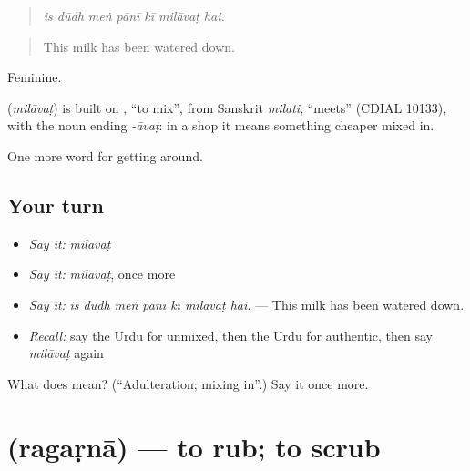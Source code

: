 \begin{quote}
      
\end{quote}

\begin{quote}
\emph{is dūdh meṅ pānī kī milāvaṭ hai.}
\end{quote}

\begin{quote}
This milk has been watered down.
\end{quote}

Feminine.

\begin{cousinweb}
\textbf{} (\emph{milāvaṭ}) is built on \textbf{}, \textquotedblleft{}to mix\textquotedblright{}, from Sanskrit \emph{milati}, \textquotedblleft{}meets\textquotedblright{} (CDIAL 10133), with the noun ending \emph{-āvaṭ}: in a shop it means something cheaper mixed in.
\end{cousinweb}

\begin{grammarlens}[title={What you've built}]
One more word for getting around.
\end{grammarlens}

\subsection*{Your turn}
\begin{itemize}
\raggedright
  \item \emph{Say it:} \emph{milāvaṭ}
  \item \emph{Say it:} \emph{milāvaṭ}, once more
  \item \emph{Say it:} \emph{is dūdh meṅ pānī kī milāvaṭ hai.} — This milk has been watered down.
  \item \emph{Recall:} say the Urdu for unmixed, then the Urdu for authentic, then say \emph{milāvaṭ} again
\end{itemize}

\begin{tcolorbox}[breakable,colback=teal!4,colframe=teal!35!black,title={Before you move on}]
What does  mean? (\textquotedblleft{}Adulteration; mixing in\textquotedblright{}.) Say it once more.
\end{tcolorbox}
\section[\texorpdfstring{\ur{رگڑنا} (ragaṛnā)}{رگڑنا (ragaṛnā)}]{ (ragaṛnā) — to rub; to scrub}

